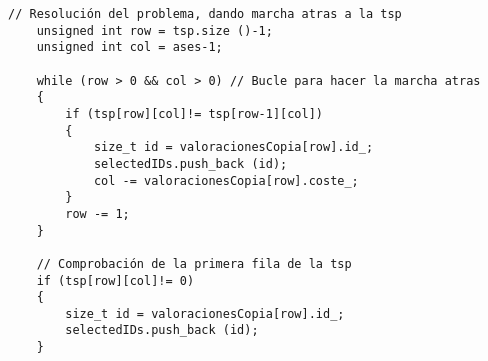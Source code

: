 \lstset{language=C++, texcl=true}
\begin{lstlisting}[frame=single]
    // Resolución del problema, dando marcha atras a la tsp
    unsigned int row = tsp.size ()-1;
    unsigned int col = ases-1;
    
    while (row > 0 && col > 0) // Bucle para hacer la marcha atras
    {
        if (tsp[row][col]!= tsp[row-1][col])
        {
            size_t id = valoracionesCopia[row].id_;
            selectedIDs.push_back (id);
            col -= valoracionesCopia[row].coste_;
        }
        row -= 1;
    }
    
    // Comprobación de la primera fila de la tsp
    if (tsp[row][col]!= 0)
    {
        size_t id = valoracionesCopia[row].id_;
        selectedIDs.push_back (id);
    }
\end{lstlisting}
